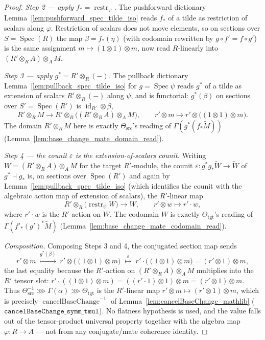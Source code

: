 \begin{proof}
  \emph{Step 2 — apply \(f_* = \operatorname{restr}_\varphi\).} The pushforward
  dictionary Lemma~\ref{lem:pushforward_spec_tilde_iso} reads \(f_*\) of a tilde as
  restriction of scalars along \(\varphi\). Restriction of scalars does not move
  elements, so on sections over \(S = \operatorname{Spec}(R)\) the map
  \(\beta = f_*(\eta)\) (with codomain rewritten by \(g \circ f' = f \circ g'\)) is the
  same assignment \(m \mapsto (1 \otimes 1) \otimes m\), now read \(R\)-linearly into
  \((R' \otimes_R A) \otimes_A M\).

  \emph{Step 3 — apply \(g^* = R' \otimes_R (-)\).} The pullback dictionary
  Lemma~\ref{lem:pullback_spec_tilde_iso} for \(g = \operatorname{Spec}\psi\) reads
  \(g^*\) of a tilde as extension of scalars \(R' \otimes_R (-)\) along \(\psi\), and is
  functorial: \(g^*(\beta)\) on sections over \(S' = \operatorname{Spec}(R')\) is
  \(\operatorname{id}_{R'} \otimes \beta\),
  \[
    R' \otimes_R M \longrightarrow R' \otimes_R \bigl((R' \otimes_R A) \otimes_A M\bigr),
    \qquad
    r' \otimes m \longmapsto r' \otimes \bigl((1 \otimes 1) \otimes m\bigr).
  \]
  The domain \(R' \otimes_R M\) here is exactly \(\Theta_{\mathrm{src}}\)'s reading of
  \(\Gamma(g^*(f_*\widetilde M))\) (Lemma~\ref{lem:base_change_mate_domain_read}).

  \emph{Step 4 — the counit \(\varepsilon\) is the extension-of-scalars counit.}
  Writing \(W = (R' \otimes_R A) \otimes_A M\) for the target \(R'\)-module, the counit
  \(\varepsilon : g^* g_* \widetilde W \to \widetilde W\) of \(g^* \dashv g_*\) is, on
  sections over \(\operatorname{Spec}(R')\) and again by
  Lemma~\ref{lem:pullback_spec_tilde_iso} (which identifies the counit with the
  algebraic action map of extension of scalars), the \(R'\)-linear map
  \[
    R' \otimes_R \bigl(\operatorname{restr}_\psi W\bigr) \longrightarrow W,
    \qquad r' \otimes w \longmapsto r' \cdot w ,
  \]
  where \(r' \cdot w\) is the \(R'\)-action on \(W\). The codomain \(W\) is exactly
  \(\Theta_{\mathrm{tgt}}\)'s reading of \(\Gamma(f'_*(g')^*\widetilde M)\)
  (Lemma~\ref{lem:base_change_mate_codomain_read}).

  \emph{Composition.} Composing Steps 3 and 4, the conjugated section map sends
  \[
    r' \otimes m
    \;\overset{g^*(\beta)}{\longmapsto}\;
    r' \otimes \bigl((1 \otimes 1) \otimes m\bigr)
    \;\overset{\varepsilon}{\longmapsto}\;
    r' \cdot \bigl((1 \otimes 1) \otimes m\bigr)
    = (r' \otimes 1) \otimes m ,
  \]
  the last equality because the \(R'\)-action on \((R' \otimes_R A) \otimes_A M\)
  multiplies into the \(R'\) tensor slot: \(r' \cdot ((1 \otimes 1) \otimes m)
  = ((r' \cdot 1) \otimes 1) \otimes m = (r' \otimes 1) \otimes m\). Thus
  \(\Theta_{\mathrm{src}}^{-1} \ggg \Gamma(\alpha) \ggg \Theta_{\mathrm{tgt}}\) is the
  \(R'\)-linear map \(r' \otimes m \mapsto (r' \otimes 1) \otimes m\), which is
  precisely \(\operatorname{cancelBaseChange}^{-1}\) of
  Lemma~\ref{lem:cancelBaseChange_mathlib}
  (\(\mathtt{cancelBaseChange\_symm\_tmul}\)). No flatness hypothesis is used, and the
  value falls out of the tensor-product universal property together with the algebra
  map \(\varphi : R \to A\) — not from any conjugate/mate coherence identity.



\end{proof}
